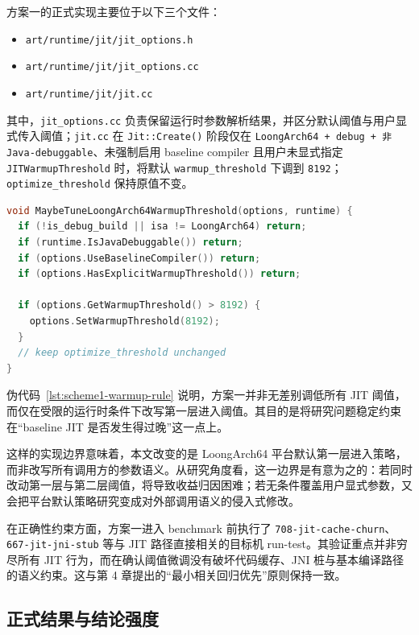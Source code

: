 方案一的正式实现主要位于以下三个文件：
\begin{itemize}
    \item \texttt{art/runtime/jit/jit\_options.h}
    \item \texttt{art/runtime/jit/jit\_options.cc}
    \item \texttt{art/runtime/jit/jit.cc}
\end{itemize}
其中，\texttt{jit\_options.cc} 负责保留运行时参数解析结果，并区分默认阈值与用户显式传入阈值；\texttt{jit.cc} 在 \texttt{Jit::Create()} 阶段仅在 \texttt{LoongArch64 + debug + 非 Java-debuggable}、未强制启用 baseline compiler 且用户未显式指定 \texttt{JITWarmupThreshold} 时，将默认 \texttt{warmup\_threshold} 下调到 \texttt{8192}；\texttt{optimize\_threshold} 保持原值不变。

\begin{lstlisting}[language=C++,caption={方案一的默认 warmup 阈值调整规则（伪代码）},label={lst:scheme1-warmup-rule}]
void MaybeTuneLoongArch64WarmupThreshold(options, runtime) {
  if (!is_debug_build || isa != LoongArch64) return;
  if (runtime.IsJavaDebuggable()) return;
  if (options.UseBaselineCompiler()) return;
  if (options.HasExplicitWarmupThreshold()) return;

  if (options.GetWarmupThreshold() > 8192) {
    options.SetWarmupThreshold(8192);
  }
  // keep optimize_threshold unchanged
}
\end{lstlisting}

伪代码~\ref{lst:scheme1-warmup-rule} 说明，方案一并非无差别调低所有 JIT 阈值，而仅在受限的运行时条件下改写第一层进入阈值。其目的是将研究问题稳定约束在“baseline JIT 是否发生得过晚”这一点上。

这样的实现边界意味着，本文改变的是 LoongArch64 平台默认第一层进入策略，而非改写所有调用方的参数语义。从研究角度看，这一边界是有意为之的：若同时改动第一层与第二层阈值，将导致收益归因困难；若无条件覆盖用户显式参数，又会把平台默认策略研究变成对外部调用语义的侵入式修改。

在正确性约束方面，方案一进入 benchmark 前执行了 \texttt{708-jit-cache-churn}、\texttt{667-jit-jni-stub} 等与 JIT 路径直接相关的目标机 run-test。其验证重点并非穷尽所有 JIT 行为，而在确认阈值微调没有破坏代码缓存、JNI 桩与基本编译路径的语义约束。这与第 4 章提出的“最小相关回归优先”原则保持一致。

\subsection{正式结果与结论强度}

